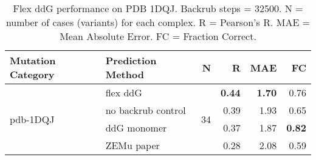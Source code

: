 \begin{table}
  \begin{tabular}{llrrrr}
\toprule
Mutation Category &   Prediction Method &   N &    R &  MAE &   FC \\
\midrule
 \multirow{ 4}{*}{pdb-1DQJ} & flex ddG & \multirow{ 4}{*}{34} & \textbf{0.44} & \textbf{1.70} & 0.76  \\
 & no backrub control & & 0.39 & 1.93 & 0.65  \\
 & ddG monomer & & 0.37 & 1.87 & \textbf{0.82}  \\
 & ZEMu paper & & 0.28 & 2.08 & 0.59  \\
\bottomrule
\end{tabular}
  \caption[Flex ddG performance on PDB 1DQJ]{
    Flex ddG performance on PDB 1DQJ. Backrub steps = 32500. N = number of cases (variants) for each complex. R = Pearson's R. MAE = Mean Absolute Error. FC = Fraction Correct.
  } \label{tab:table-pdb-1DQJ}
\end{table}
